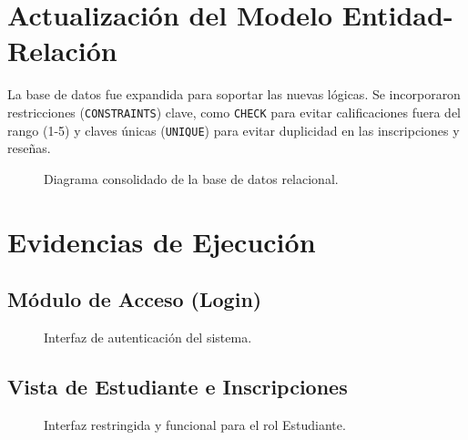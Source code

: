 \documentclass[11pt, a4paper]{article}
\begin{document}
\section{Actualización del Modelo Entidad-Relación}
La base de datos fue expandida para soportar las nuevas lógicas. Se incorporaron restricciones (\texttt{CONSTRAINTS}) clave, como \texttt{CHECK} para evitar calificaciones fuera del rango (1-5) y claves únicas (\texttt{UNIQUE}) para evitar duplicidad en las inscripciones y reseñas.

\begin{figure}[htbp]
  \centering
  \caption{Diagrama consolidado de la base de datos relacional.}
\end{figure}

\section{Evidencias de Ejecución}

\subsection{Módulo de Acceso (Login)}
\begin{figure}[htbp]
  \centering
  \caption{Interfaz de autenticación del sistema.}
\end{figure}

\subsection{Vista de Estudiante e Inscripciones}
\begin{figure}[htbp]
  \centering
  \caption{Interfaz restringida y funcional para el rol Estudiante.}
\end{figure}
\end{document}
